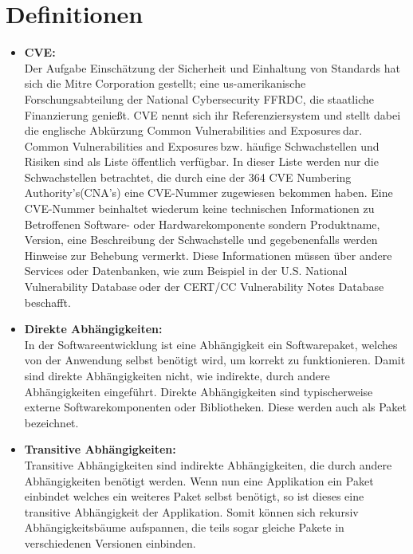 \section{Definitionen} \label{sec:Definitionen}
\begin{itemize}
    \item \textbf{\ac{CVE}:} \\
    Der Aufgabe Einschätzung der Sicherheit und Einhaltung von Standards hat sich die Mitre Corporation\textsuperscript{\cite{link:MitreCve}} gestellt; eine us-amerikanische Forschungsabteilung der \glqq National Cybersecurity FFRDC\grqq, die staatliche Finanzierung genießt.
    \acs{CVE} nennt sich ihr Referenziersystem und stellt dabei die englische Abkürzung \glqq Common Vulnerabilities and Exposures\grqq$~$dar.
    \\
    \glqq Common Vulnerabilities and Exposures\grqq$~$bzw. häufige Schwachstellen und Risiken sind als Liste öffentlich verfügbar.
    In dieser Liste werden nur die Schwachstellen betrachtet, die durch eine der 364 \glqq \ac{CVE} Numbering Authority's\grqq (\acs{CNA}'s) eine \ac{CVE}-Nummer zugewiesen bekommen haben.\cite{link:CveOrgCnaS}
    Eine \ac{CVE}-Nummer beinhaltet wiederum keine technischen Informationen zu Betroffenen Software- oder Hardwarekomponente sondern Produktname, Version, eine Beschreibung der Schwachstelle und gegebenenfalls werden Hinweise zur Behebung vermerkt.
    Diese Informationen müssen über andere Services oder Datenbanken, wie zum Beispiel in der \glqq U.S. National Vulnerability Database\grqq$~$oder der \glqq CERT/CC Vulnerability Notes Database\grqq$~$beschafft.

    \item \textbf{Direkte Abhängigkeiten:} \\
    In der Softwareentwicklung ist eine Abhängigkeit ein Softwarepaket, welches von der Anwendung selbst benötigt wird, um korrekt zu funktionieren.
    Damit sind direkte Abhängigkeiten nicht, wie indirekte, durch andere Abhängigkeiten eingeführt.
    Direkte Abhängigkeiten sind typischerweise externe Softwarekomponenten oder Bibliotheken.
    Diese werden auch als Paket bezeichnet. 

    \item \textbf{Transitive Abhängigkeiten:} \\
    Transitive Abhängigkeiten sind indirekte Abhängigkeiten, die durch andere Abhängigkeiten benötigt werden.
    Wenn nun eine Applikation ein Paket einbindet welches ein weiteres Paket selbst benötigt, so ist dieses eine transitive Abhängigkeit der Applikation.
    Somit können sich rekursiv Abhängigkeitsbäume aufspannen, die teils sogar gleiche Pakete in verschiedenen Versionen einbinden.


\end{itemize}
